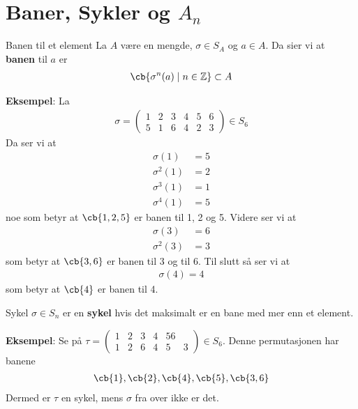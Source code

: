 \section{Baner, Sykler og $A_n$}

\begin{definition}{Banen til et element}{}
  La $A$ være en mengde, $\sigma\in S_A$ og $a\in A$. Da sier vi at \textbf{banen} til $a$ er
  \begin{align}
    \cb{\sigma^n(a)\mid n\in \mathbb{Z}}\subset A
  \end{align}
\end{definition}

\textbf{Eksempel}:
La
\begin{align}
  \sigma=\begin{pmatrix}1 & 2 & 3 & 4 & 5 & 6 \\ 5 & 1 & 6 & 4 & 2 & 3\end{pmatrix}\in S_6
\end{align}
Da ser vi at 
\begin{align}
  \sigma(1)&=5 \\
  \sigma^2(1)&=2 \\
  \sigma^3(1)&=1 \\
  \sigma^4(1)&=5 
\end{align}
noe som betyr at $\cb{1, 2, 5}$ er banen til 1, 2 og 5. Videre ser vi at 
\begin{align}
  \sigma(3)&=6 \\
  \sigma^2(3)&=3
\end{align}
som betyr at $\cb{3, 6}$ er banen til 3 og til 6. Til slutt så ser vi at
\begin{align}
  \sigma(4)=4
\end{align}
som betyr at $\cb{4}$ er banen til 4. 

\begin{definition}{Sykel}{}
  $\sigma\in S_n$ er en \textbf{sykel} hvis det maksimalt er en bane med mer enn et element. 
\end{definition}

\textbf{Eksempel}: Se på 
$\tau=\begin{pmatrix}1 & 2 & 3 & 4 & 5 6 \\ 1 & 2 & 6 & 4 & 5 & 3\end{pmatrix}\in S_6$. Denne
permutasjonen har banene
\begin{align}
  \cb{1}, \cb{2}, \cb{4}, \cb{5}, \cb{3, 6}
\end{align}
Dermed er $\tau$ en sykel, mens $\sigma$ fra over ikke er det.

